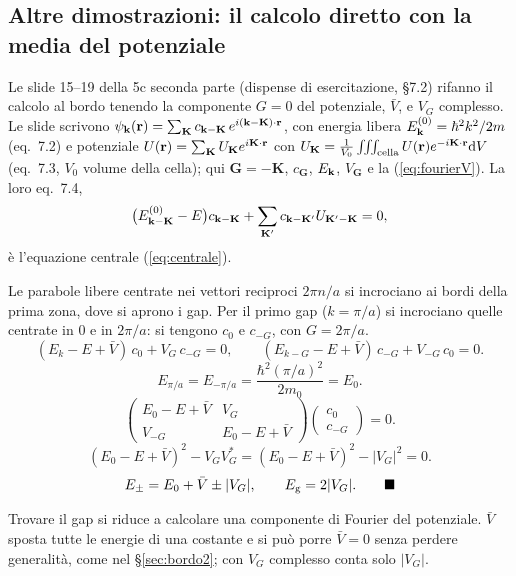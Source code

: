 \documentclass[11pt,a4paper]{article}
\begin{document}
\subsection{Altre dimostrazioni: il calcolo diretto con la media del potenziale}\label{sec:qfdiretto}
Le slide 15--19 della 5c seconda parte (dispense di esercitazione, §7.2) rifanno il calcolo al bordo tenendo la componente $G=0$ del potenziale,
$\bar V$, e $V_G$ complesso. Le slide scrivono $\psi_{\mathbf k}(\mathbf r)=\sum_{\mathbf K}c_{\mathbf k-\mathbf K}\,e^{i(\mathbf k-\mathbf K)\cdot\mathbf r}$, con energia libera
$E^{(0)}_{\mathbf k}=\hbar^2k^2/2m$ (eq.~7.2) e potenziale $U(\mathbf r)=\sum_{\mathbf K}U_{\mathbf K}e^{i\mathbf K\cdot\mathbf r}$ con
$U_{\mathbf K}=\frac1{V_0}\iiint_{\text{cella}}U(\mathbf r)e^{-i\mathbf K\cdot\mathbf r}\mathrm d V$ (eq.~7.3, $V_0$ volume della cella); qui $\mathbf G=-\mathbf K$, $c_{\mathbf G}$, $E_{\mathbf k}$,
$V_{\mathbf G}$ e la (\ref{eq:fourierV}). La loro eq.~7.4,
\[
\bigl(E^{(0)}_{\mathbf k-\mathbf K}-E\bigr)c_{\mathbf k-\mathbf K}+\sum_{\mathbf K'}c_{\mathbf k-\mathbf K'}U_{\mathbf K'-\mathbf K}=0,
\]
è l'equazione centrale (\ref{eq:centrale}).
\begin{dimostrazione}
Le parabole libere centrate nei vettori reciproci $2\pi n/a$ si incrociano ai bordi della prima zona, dove si aprono i gap. Per il primo gap ($k=\pi/a$)
si incrociano quelle centrate in $0$ e in $2\pi/a$: si tengono $c_0$ e $c_{-G}$, con $G=2\pi/a$.
\[
(E_k-E+\bar V)\,c_0+V_G\,c_{-G}=0,\qquad(E_{k-G}-E+\bar V)\,c_{-G}+V_{-G}\,c_0=0 .
\]
\[
E_{\pi/a}=E_{-\pi/a}=\frac{\hbar^2(\pi/a)^2}{2m_0}=E_0 .
\]
\[
\begin{pmatrix}E_0-E+\bar V&V_G\\V_{-G}&E_0-E+\bar V\end{pmatrix}\begin{pmatrix}c_0\\c_{-G}\end{pmatrix}=0 .
\]
\[
(E_0-E+\bar V)^2-V_GV_G^*=(E_0-E+\bar V)^2-|V_G|^2=0 .
\]
\[
E_\pm=E_0+\bar V\pm|V_G|,\qquad\Eg=2|V_G| .\qed
\]
\end{dimostrazione}
Trovare il gap si riduce a calcolare una componente di Fourier del potenziale. $\bar V$ sposta tutte le energie di una costante e si può porre $\bar V=0$
senza perdere generalità, come nel §\ref{sec:bordo2}; con $V_G$ complesso conta solo $|V_G|$.
\end{document}
